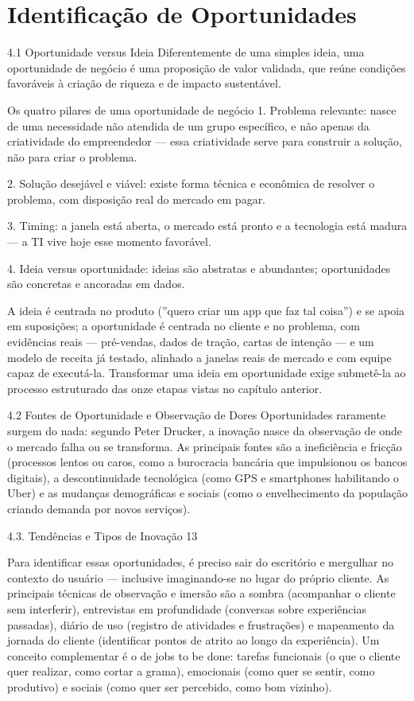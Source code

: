 \chapter{Identificação de Oportunidades}

4.1 Oportunidade versus Ideia Diferentemente de uma simples ideia, uma oportunidade de negócio é uma proposição de valor validada, que reúne condições favoráveis à criação de riqueza e de impacto sustentável.

Os quatro pilares de uma oportunidade de negócio 1. Problema relevante: nasce de uma necessidade não atendida de um grupo específico, e não apenas da criatividade do empreendedor — essa criatividade serve para construir a solução, não para criar o problema.

2. Solução desejável e viável: existe forma técnica e econômica de resolver o problema, com disposição real do mercado em pagar.

3. Timing: a janela está aberta, o mercado está pronto e a tecnologia está madura — a TI vive hoje esse momento favorável.

4. Ideia versus oportunidade: ideias são abstratas e abundantes; oportunidades são concretas e ancoradas em dados.

A ideia é centrada no produto (”quero criar um app que faz tal coisa”) e se apoia em suposições; a oportunidade é centrada no cliente e no problema, com evidências reais — pré-vendas, dados de tração, cartas de intenção — e um modelo de receita já testado, alinhado a janelas reais de mercado e com equipe capaz de executá-la. Transformar uma ideia em oportunidade exige submetê-la ao processo estruturado das onze etapas vistas no capítulo anterior.

4.2 Fontes de Oportunidade e Observação de Dores Oportunidades raramente surgem do nada: segundo Peter Drucker, a inovação nasce da observação de onde o mercado falha ou se transforma. As principais fontes são a ineficiência e fricção (processos lentos ou caros, como a burocracia bancária que impulsionou os bancos digitais), a descontinuidade tecnológica (como GPS e smartphones habilitando o Uber) e as mudanças demográficas e sociais (como o envelhecimento da população criando demanda por novos serviços).

4.3. Tendências e Tipos de Inovação 13

Para identificar essas oportunidades, é preciso sair do escritório e mergulhar no contexto do usuário — inclusive imaginando-se no lugar do próprio cliente. As principais técnicas de observação e imersão são a sombra (acompanhar o cliente sem interferir), entrevistas em profundidade (conversas sobre experiências passadas), diário de uso (registro de atividades e frustrações) e mapeamento da jornada do cliente (identificar pontos de atrito ao longo da experiência). Um conceito complementar é o de jobs to be done: tarefas funcionais (o que o cliente quer realizar, como cortar a grama), emocionais (como quer se sentir, como produtivo) e sociais (como quer ser percebido, como bom vizinho).

